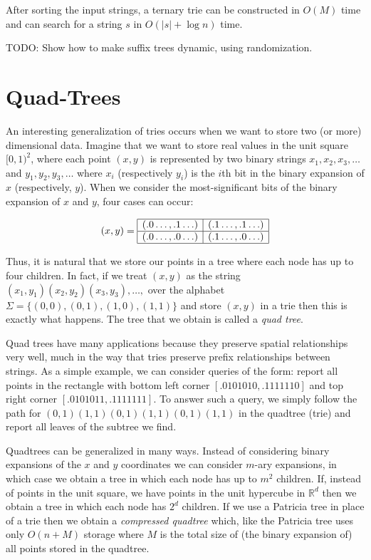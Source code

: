 \begin{thm}
After sorting the input strings, a ternary trie can be constructed in
$O(M)$ time and can search for a string $s$ in $O(|s|+\log n)$ time.
\end{thm}

TODO: Show how to make suffix trees dynamic, using randomization.

\section{Quad-Trees}

An interesting generalization of tries occurs when we want to store
two (or more) dimensional data.  Imagine that we want to store real
values in the unit square $[0,1)^2$, where each point $(x,y)$ is
represented by two binary strings $x_1,x_2,x_3,\ldots$ and
$y_1,y_2,y_3,\ldots$ where $x_i$ (respectively $y_i$) is the
$i$th bit in the binary expansion of $x$ (respectively, $y$).  When we
consider the most-significant bits of the binary expansion of $x$ and
$y$, four cases can occur:


\[(x,y) = \begin{array}{|c|c|}\hline
(.0\ldots,.1\ldots) & (.1\ldots,.1\ldots) \\ \hline
(.0\ldots,.0\ldots) & (.1\ldots,.0\ldots) \\ \hline
\end{array}
\]

Thus, it is natural that we store our points in a tree where each node
has up to four children.  In fact, if we treat $(x,y)$ as the string
$(x_1,y_1)(x_2,y_2)(x_3,y_3),\ldots,$ over the alphabet
$\Sigma=\{(0,0),(0,1),(1,0),(1,1)\}$ and store $(x,y)$ in a trie then
this is exactly what happens.  The tree that we obtain is called a
\emph{quad tree}.

Quad trees have many applications because they preserve spatial
relationships very well, much in the way that tries preserve prefix
relationships between strings.  As a simple example, we can consider
queries of the form: report all points in the rectangle with bottom
left corner $[.0101010,.1111110]$ and top right corner
$[.0101011,.1111111]$.  To answer such a query, we simply follow the
path for $(0,1)(1,1)(0,1)(1,1)(0,1)(1,1)$ in the quadtree (trie) and
report all leaves of the subtree we find.

Quadtrees can be generalized in many ways.  Instead of considering
binary expansions of the $x$ and $y$ coordinates we can consider
$m$-ary expansions, in which case we obtain a tree in which each node
has up to $m^2$ children.  If, instead of points in the unit square,
we have points in the unit hypercube in $\mathbb{R}^d$ then we obtain
a tree in which each node has $2^d$ children.  If we use a Patricia
tree in place of a trie then we obtain a \emph{compressed quadtree}
which, like the Patricia tree uses only $O(n+M)$ storage where $M$ is
the total size of (the binary expansion of) all points stored in the
quadtree.  

